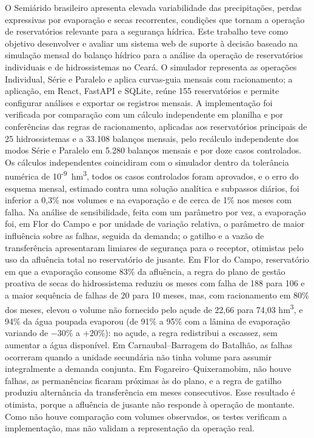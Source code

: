 O Semiárido brasileiro apresenta elevada variabilidade das precipitações, perdas expressivas por evaporação e secas recorrentes, condições que tornam a operação de reservatórios relevante para a segurança hídrica. Este trabalho teve como objetivo desenvolver e avaliar um sistema web de suporte à decisão baseado na simulação mensal do balanço hídrico para a análise da operação de reservatórios individuais e de hidrossistemas no Ceará. O simulador representa as operações Individual, Série e Paralelo e aplica curvas-guia mensais com racionamento; a aplicação, em React, FastAPI e SQLite, reúne 155 reservatórios e permite configurar análises e exportar os registros mensais. A implementação foi verificada por comparação com um cálculo independente em planilha e por conferências das regras de racionamento, aplicadas aos reservatórios principais de 25 hidrossistemas e a 33.108 balanços mensais, pelo recálculo independente dos modos Série e Paralelo em 5.280 balanços mensais e por doze casos controlados. Os cálculos independentes coincidiram com o simulador dentro da tolerância numérica de 10\textsuperscript{-9}~hm\textsuperscript{3}, todos os casos controlados foram aprovados, e o erro do esquema mensal, estimado contra uma solução analítica e subpassos diários, foi inferior a 0,3\% nos volumes e na evaporação e de cerca de 1\% nos meses com falha. Na análise de sensibilidade, feita com um parâmetro por vez, a evaporação foi, em Flor do Campo e por unidade de variação relativa, o parâmetro de maior influência sobre as falhas, seguida da demanda; o gatilho e a vazão de transferência apresentaram limiares de segurança para o receptor, otimistas pelo uso da afluência total no reservatório de jusante. Em Flor do Campo, reservatório em que a evaporação consome 83\% da afluência, a regra do plano de gestão proativa de secas do hidrossistema reduziu os meses com falha de 188 para 106 e a maior sequência de falhas de 20 para 10 meses, mas, com racionamento em 80\% dos meses, elevou o volume não fornecido pelo açude de 22,66 para 74,03 hm\textsuperscript{3}, e 94\% da água poupada evaporou (de 91\% a 95\% com a lâmina de evaporação variando de $-30$\% a $+20$\%): no açude, a regra redistribui a escassez, sem aumentar a água disponível. Em Carnaubal--Barragem do Batalhão, as falhas ocorreram quando a unidade secundária não tinha volume para assumir integralmente a demanda conjunta. Em Fogareiro--Quixeramobim, não houve falhas, as permanências ficaram próximas às do plano, e a regra de gatilho produziu alternância da transferência em meses consecutivos. Esse resultado é otimista, porque a afluência de jusante não responde à operação de montante. Como não houve comparação com volumes observados, os testes verificam a implementação, mas não validam a representação da operação real.

